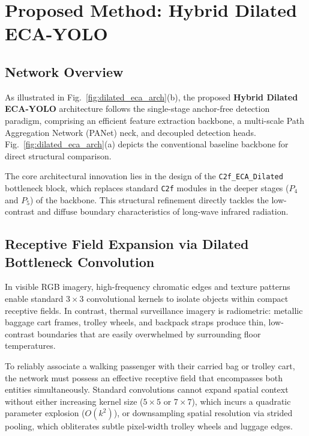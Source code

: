 \documentclass[journal,twoside,web]{ieeecolor}
\begin{document}
\section{Proposed Method: Hybrid Dilated ECA-YOLO}
\label{sec:proposed_method}

\subsection{Network Overview}
As illustrated in Fig.~\ref{fig:dilated_eca_arch}(b), the proposed \textbf{Hybrid Dilated ECA-YOLO} architecture follows the single-stage anchor-free detection paradigm, comprising an efficient feature extraction backbone, a multi-scale Path Aggregation Network (PANet) neck, and decoupled detection heads. Fig.~\ref{fig:dilated_eca_arch}(a) depicts the conventional baseline backbone for direct structural comparison.

The core architectural innovation lies in the design of the \texttt{C2f\_ECA\_Dilated} bottleneck block, which replaces standard \texttt{C2f} modules in the deeper stages ($P_4$ and $P_5$) of the backbone. This structural refinement directly tackles the low-contrast and diffuse boundary characteristics of long-wave infrared radiation.

\subsection{Receptive Field Expansion via Dilated Bottleneck Convolution}
In visible RGB imagery, high-frequency chromatic edges and texture patterns enable standard $3\times3$ convolutional kernels to isolate objects within compact receptive fields. In contrast, thermal surveillance imagery is radiometric: metallic baggage cart frames, trolley wheels, and backpack straps produce thin, low-contrast boundaries that are easily overwhelmed by surrounding floor temperatures. 

To reliably associate a walking passenger with their carried bag or trolley cart, the network must possess an effective receptive field that encompasses both entities simultaneously. Standard convolutions cannot expand spatial context without either increasing kernel size ($5\times5$ or $7\times7$), which incurs a quadratic parameter explosion ($O(k^2)$), or downsampling spatial resolution via strided pooling, which obliterates subtle pixel-width trolley wheels and luggage edges.
\end{document}
